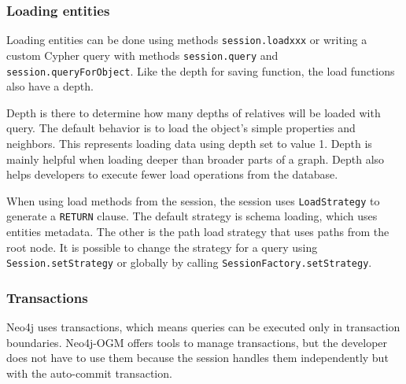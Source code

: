 \subsubsection {Loading entities}

Loading entities can be done using methods \texttt{session.loadxxx} or writing a custom Cypher query with methods \texttt{session.query} and \texttt{session.queryForObject}.
Like the depth for saving function, the load functions also have a depth.

Depth is there to determine how many depths of relatives will be loaded with query. The default behavior is to load the object's simple properties and neighbors.
This represents loading data using depth set to value 1. Depth is mainly helpful when loading deeper than broader parts of a graph. Depth also helps developers to
execute fewer load operations from the database.

When using load methods from the session, the session uses \texttt{LoadStrategy} to generate a \texttt{RETURN} clause. The default strategy is schema loading,
which uses entities metadata. The other is the path load strategy that uses paths from the root node. It is possible to change the strategy for a query using \texttt{Session.setStrategy}
or globally by calling \texttt{SessionFactory.setStrategy}.

\subsubsection{Transactions}

Neo4j uses transactions, which means queries can be executed only in transaction boundaries. Neo4j-OGM offers tools to manage transactions, but the developer does not have to use them because the session handles them independently but with the auto-commit transaction.
